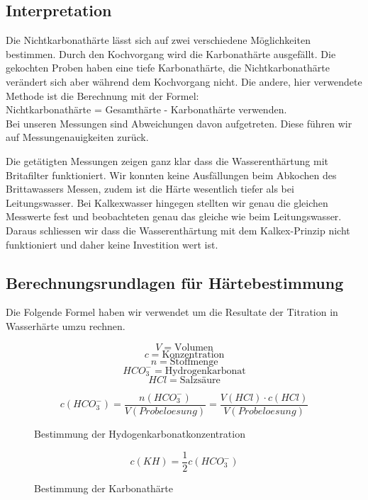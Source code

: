\documentclass[10pt,oneside,a4paper,fleqn]{article}
\begin{document}
\subsection{Interpretation}
Die Nichtkarbonathärte lässt sich auf zwei verschiedene Möglichkeiten bestimmen.
Durch den Kochvorgang wird die Karbonathärte ausgefällt. Die gekochten Proben
haben eine tiefe Karbonathärte, die Nichtkarbonathärte verändert sich aber
während dem Kochvorgang nicht. Die andere, hier verwendete Methode ist die
Berechnung mit der Formel:\\
Nichtkarbonathärte = Gesamthärte - Karbonathärte verwenden.\\
Bei unseren Messungen sind Abweichungen davon aufgetreten. Diese führen wir auf
Messungenauigkeiten zurück.

Die getätigten Messungen zeigen ganz klar dass die Wasserenthärtung mit
Britafilter funktioniert. Wir konnten keine Ausfällungen beim Abkochen des
Brittawassers Messen, zudem ist die Härte wesentlich tiefer als bei
Leitungswasser. Bei Kalkexwasser hingegen stellten wir genau die gleichen
Messwerte fest und beobachteten genau das gleiche wie beim Leitungswasser.
Daraus schliessen wir dass die Wasserenthärtung mit dem Kalkex-Prinzip nicht
funktioniert und daher keine Investition wert ist.


\subsection{Berechnungsrundlagen für Härtebestimmung}
Die Folgende Formel haben wir verwendet um die Resultate der Titration in
Wasserhärte umzu rechnen.
\begin{multicols}{3}
	$$V=\textrm{Volumen}$$
	$$c=\textrm{Konzentration}$$
	$$n=\textrm{Stoffmenge}$$
	$$HCO_3^-=\textrm{Hydrogenkarbonat}$$
	$$HCl=\textrm{Salzsäure}$$
\end{multicols}
	\begin{figure}[!h]
	\caption{Bestimmung der Hydogenkarbonatkonzentration}
	\label{equ:konezantration}
		$$c\left(HCO_3^-\right)=\frac{n\left(HCO_3^-\right)}{V\left(Probeloesung\right)}=
		\frac{V\left(HCl\right)\cdot c \left(HCl\right)}{V\left(Probeloesung\right)}$$
	\end{figure}
	
	\begin{figure}[!h]
	\caption{Bestimmung der Karbonathärte}
	\label{equ:karbonathaerte}
		$$c\left(KH\right)=\frac{1}{2}c\left(HCO_3^-\right)$$
	\end{figure}
	
\end{document}
